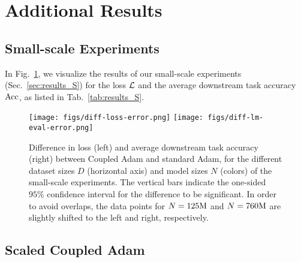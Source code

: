 

\section{Additional Results}

\subsection{Small-scale Experiments}
\label{app:additional_results_S}

In Fig.~\ref{fig:results_S2}, we visualize the results of our small-scale experiments (Sec.~\ref{sec:results_S}) for the loss $\mathcal{L}$ and the average downstream task accuracy $\rm Acc$, as listed in Tab.~\ref{tab:results_S}.
\begin{figure*}[t]
    \centering
    \texttt{[image: figs/diff-loss-error.png]} \qquad
    \texttt{[image: figs/diff-lm-eval-error.png]}
    \caption{Difference in loss (left) and average downstream task accuracy (right) between Coupled Adam and standard Adam, for the different dataset sizes $D$ (horizontal axis) and model sizes $N$ (colors) of the small-scale experiments. The vertical bars indicate the one-sided $95\%$ confidence interval for the difference to be significant. In order to avoid overlaps, the data points for $N=125\rm M$ and $N=760\rm M$ are slightly shifted to the left and right, respectively. }
    \label{fig:results_S2}
\end{figure*}

\subsection{Scaled Coupled Adam}
\label{app:additional_results_scale}

